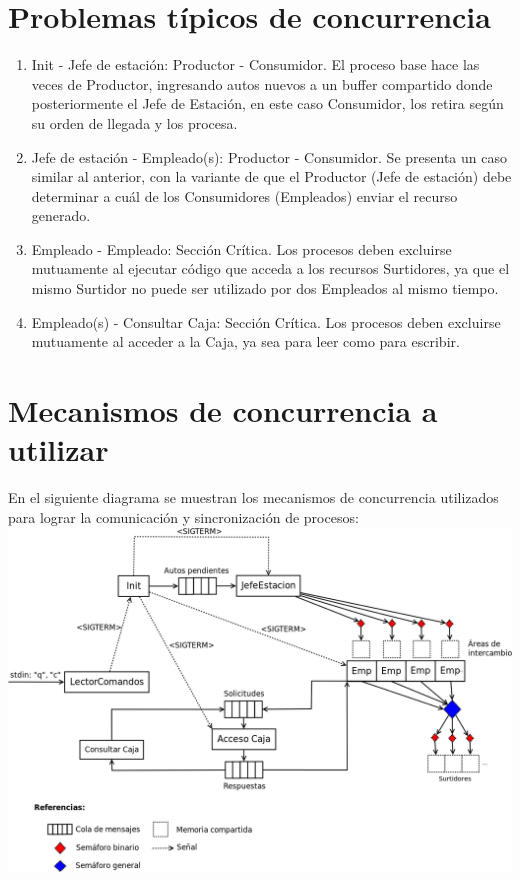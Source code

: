 \documentclass{article}
\begin{document}
\section{Problemas típicos de concurrencia}
\begin{enumerate}
	\item Init - Jefe de estación: Productor - Consumidor. El proceso base hace las veces de Productor, ingresando autos nuevos a un buffer compartido donde posteriormente el Jefe de Estación, en este caso Consumidor, los retira según su orden de llegada y los procesa.
	\item Jefe de estación - Empleado(s): Productor - Consumidor. Se presenta un caso similar al anterior, con la variante de que el Productor (Jefe de estación) debe determinar a cuál de los Consumidores (Empleados) enviar el recurso generado.
	\item Empleado - Empleado: Sección Crítica. Los procesos deben excluirse mutuamente al ejecutar código que acceda a los recursos Surtidores, ya que el mismo Surtidor no puede ser utilizado por dos Empleados al mismo tiempo.
	\item Empleado(s) - Consultar Caja: Sección Crítica. Los procesos deben excluirse mutuamente al acceder a la Caja, ya sea para leer como para escribir.
\end{enumerate}
\section{Mecanismos de concurrencia a utilizar}
En el siguiente diagrama se muestran los mecanismos de concurrencia utilizados para lograr la comunicación y sincronización de procesos:
\\[1\baselineskip]
\includegraphics[width=\textwidth]{mecanismos2}
\end{document}
